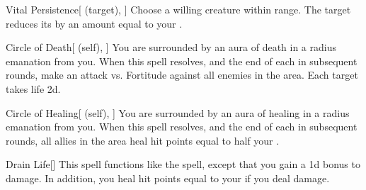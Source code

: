 \lowercase{\hypertarget{spell:Vital Persistence}{}}\label{spell:Vital Persistence}
\begin{attuneability}[\nth{2}]{\hypertarget{spell:Vital Persistence}{Vital Persistence}}[ (target), ]
Choose a willing creature within \rngclose range.
The target reduces its  by an amount equal to your .
\end{attuneability}
\vspace{0.25em}



\lowercase{\hypertarget{spell:Circle of Death}{}}\label{spell:Circle of Death}
\begin{attuneability}[\nth{3}]{\hypertarget{spell:Circle of Death}{Circle of Death}}[ (self), ]
You are surrounded by an aura of death in a \areamed radius emanation from you.
When this spell resolves, and the end of each  in subsequent rounds, make an attack vs. Fortitude against all enemies in the area.
\hit Each target takes life  \minus2d.
\end{attuneability}
\vspace{0.25em}



\lowercase{\hypertarget{spell:Circle of Healing}{}}\label{spell:Circle of Healing}
\begin{attuneability}[\nth{3}]{\hypertarget{spell:Circle of Healing}{Circle of Healing}}[ (self), ]
You are surrounded by an aura of healing in a \areamed radius emanation from you.
When this spell resolves, and the end of each  in subsequent rounds, all allies in the area heal hit points equal to half your .
\end{attuneability}
\vspace{0.25em}



\lowercase{\hypertarget{spell:Drain Life}{}}\label{spell:Drain Life}
\begin{apability}[\nth{3}]{\hypertarget{spell:Drain Life}{Drain Life}}[]
This spell functions like the  spell, except that you gain a \plus1d bonus to damage.
In addition, you heal hit points equal to your  if you deal damage.
\end{apability}
\vspace{0.25em}



